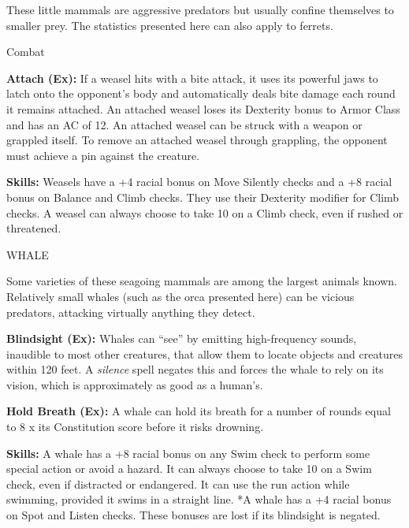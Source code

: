 \documentclass{article}
\begin{document}
These little mammals are aggressive predators but usually confine themselves to 
smaller prey. The statistics presented here can also apply to ferrets.

Combat

\textbf{Attach (Ex):} If a weasel hits with a bite attack, it uses its powerful 
jaws to latch onto the opponent's body and automatically deals bite damage each 
round it remains attached. An attached weasel loses its Dexterity bonus to Armor 
Class and has an AC of 12. An attached weasel can be struck with a weapon or grappled 
itself. To remove an attached weasel through grappling, the opponent must achieve 
a pin against the creature.

\textbf{Skills:} Weasels have a +4 racial bonus on Move Silently checks and a +8 
racial bonus on Balance and Climb checks. They use their Dexterity modifier for 
Climb checks. A weasel can always choose to take 10 on a Climb check, even if rushed 
or threatened.

\vspace{12pt}
WHALE

Some varieties of these seagoing mammals are among the largest animals known. Relatively 
small whales (such as the orca presented here) can be vicious predators, attacking 
virtually anything they detect.

\textbf{Blindsight (Ex):} Whales can ``see'' by emitting high-frequency sounds, 
inaudible to most other creatures, that allow them to locate objects and creatures 
within 120 feet. A \textit{silence }spell negates this and forces the whale to 
rely on its vision, which is approximately as good as a human's.

\textbf{Hold Breath (Ex):} A whale can hold its breath for a number of rounds equal 
to 8 x $ $its Constitution score before it risks drowning. 

\textbf{Skills:} A whale has a +8 racial bonus on any Swim check to perform some 
special action or avoid a hazard. It can always choose to take 10 on a Swim check, 
even if distracted or endangered. It can use the run action while swimming, provided 
it swims in a straight line. *A whale has a +4 racial bonus on Spot and Listen 
checks. These bonuses are lost if its blindsight is negated.
\end{document}
